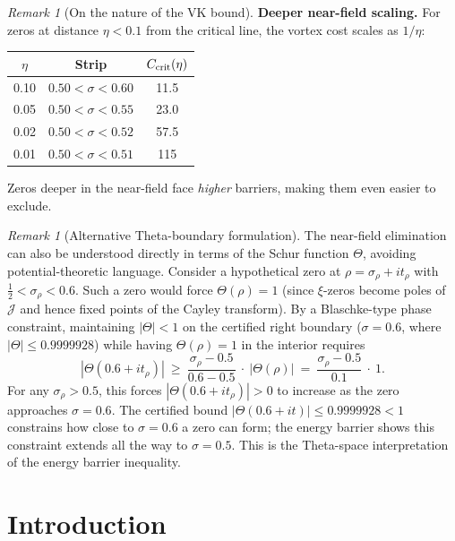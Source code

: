 \documentclass[11pt]{article}
\theoremstyle{definition}
\theoremstyle{remark}
\newtheorem{remark}[theorem]{Remark}
\theoremstyle{definition}
\begin{document}
\begin{remark}[On the nature of the VK bound]
\smallskip\noindent
\textbf{Deeper near-field scaling.}
For zeros at distance $\eta < 0.1$ from the critical line, the vortex cost scales as $1/\eta$:
\begin{center}
\begin{tabular}{ccc}
$\eta$ & Strip & $C_{\rm crit}(\eta)$ \\
\hline
0.10 & $0.50 < \sigma < 0.60$ & 11.5 \\
0.05 & $0.50 < \sigma < 0.55$ & 23.0 \\
0.02 & $0.50 < \sigma < 0.52$ & 57.5 \\
0.01 & $0.50 < \sigma < 0.51$ & 115 \\
\end{tabular}
\end{center}
Zeros deeper in the near-field face \emph{higher} barriers, making them even easier to exclude.
\end{remark}

\begin{remark}[Alternative Theta-boundary formulation]\label{rem:theta-boundary}
The near-field elimination can also be understood directly in terms of the Schur function $\Theta$, avoiding potential-theoretic language.
Consider a hypothetical zero at $\rho = \sigma_\rho + i t_\rho$ with $\tfrac{1}{2} < \sigma_\rho < 0.6$.
Such a zero would force $\Theta(\rho) = 1$ (since $\xi$-zeros become poles of $\mathcal{J}$ and hence fixed points of the Cayley transform).
By a Blaschke-type phase constraint, maintaining $|\Theta| < 1$ on the certified right boundary ($\sigma = 0.6$, where $|\Theta| \le 0.9999928$) while having $\Theta(\rho) = 1$ in the interior requires
\[
  |\Theta(0.6 + it_\rho)|\ \ge\ \frac{\sigma_\rho - 0.5}{0.6 - 0.5}\ \cdot\ |\Theta(\rho)|\ =\ \frac{\sigma_\rho - 0.5}{0.1}\ \cdot\ 1.
\]
For any $\sigma_\rho > 0.5$, this forces $|\Theta(0.6 + it_\rho)| > 0$ to increase as the zero approaches $\sigma = 0.6$.
The certified bound $|\Theta(0.6 + it)| \le 0.9999928 < 1$ constrains how close to $\sigma = 0.6$ a zero can form; the energy barrier shows this constraint extends all the way to $\sigma = 0.5$.
This is the Theta-space interpretation of the energy barrier inequality.
\end{remark}

\section{Introduction}
\end{document}
